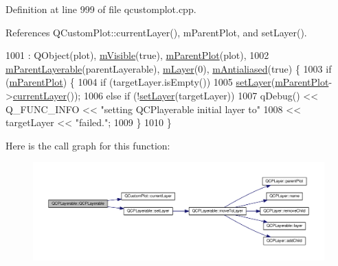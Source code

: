 Definition at line 999 of file qcustomplot.\+cpp.



References Q\+Custom\+Plot\+::current\+Layer(), m\+Parent\+Plot, and set\+Layer().


\begin{DoxyCode}
1001     : QObject(plot), \hyperlink{class_q_c_p_layerable_a62e3aed8427d6ce3ccf716f285106cb3}{mVisible}(\textcolor{keyword}{true}), \hyperlink{class_q_c_p_layerable_aa2a528433e44db02b8aef23c1f9f90ed}{mParentPlot}(plot),
1002       \hyperlink{class_q_c_p_layerable_a3291445a980053e2d17a21d15957624e}{mParentLayerable}(parentLayerable), \hyperlink{class_q_c_p_layerable_aa38ec5891aff0f50b36fd63e9372a0cd}{mLayer}(0), 
      \hyperlink{class_q_c_p_layerable_a3ab45a4c76a3333ce42eb217a81733ec}{mAntialiased}(\textcolor{keyword}{true}) \{
1003   \textcolor{keywordflow}{if} (\hyperlink{class_q_c_p_layerable_aa2a528433e44db02b8aef23c1f9f90ed}{mParentPlot}) \{
1004     \textcolor{keywordflow}{if} (targetLayer.isEmpty())
1005       \hyperlink{class_q_c_p_layerable_ab0d0da6d2de45a118886d2c8e16d5a54}{setLayer}(\hyperlink{class_q_c_p_layerable_aa2a528433e44db02b8aef23c1f9f90ed}{mParentPlot}->\hyperlink{class_q_custom_plot_af73057345656cbd1463454982d808b00}{currentLayer}());
1006     \textcolor{keywordflow}{else} \textcolor{keywordflow}{if} (!\hyperlink{class_q_c_p_layerable_ab0d0da6d2de45a118886d2c8e16d5a54}{setLayer}(targetLayer))
1007       qDebug() << Q\_FUNC\_INFO << \textcolor{stringliteral}{"setting QCPlayerable initial layer to"}
1008                << targetLayer << \textcolor{stringliteral}{"failed."};
1009   \}
1010 \}
\end{DoxyCode}


Here is the call graph for this function\+:\nopagebreak
\begin{figure}[H]
\begin{center}
\leavevmode
\includegraphics[width=350pt]{class_q_c_p_layerable_a74c0fa237f29bf0e49565013fc5d1ec0_cgraph}
\end{center}
\end{figure}


